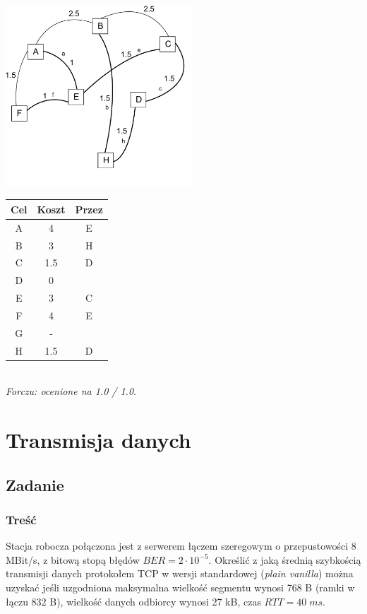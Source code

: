			\includegraphics[width=7.0cm]{./images/zadanie06.pdf}     
			\begin{tabular}{c|c|c}
				Cel & Koszt & Przez \\ \hline
				A   & 4     & E     \\
				B   & 3     & H     \\
				C   & 1.5   & D     \\
				D   & 0     &       \\
				E   & 3     & C     \\
				F   & 4     & E     \\
				G   & -     &       \\
				H   & 1.5   & D     
			\end{tabular}\\
			\small{ \emph{Forczu: ocenione na 1.0 / 1.0}}.
			
\section{Transmisja danych}
	\subsection{Zadanie}
		\subsubsection{Treść}
			Stacja robocza połączona jest z serwerem łączem szeregowym o przepustowości 8 MBit/s, z bitową stopą błędów $ BER=2\cdot 10^{-5} $. Określić z jaką średnią szybkością transmisji danych protokołem TCP w wersji standardowej (\emph{plain vanilla}) można uzyskać jeśli uzgodniona maksymalna wielkość segmentu wynosi 768 B (ramki w łączu 832 B), wielkość danych odbiorcy wynosi 27 kB, czas $ RTT=40\;ms $.
